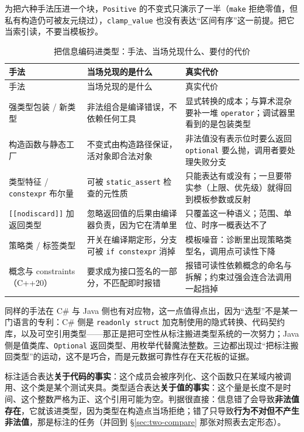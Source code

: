 \documentclass[12pt,a4paper,fontset=fandol]{ctexbook}
\begin{document}
\begin{warning}[title={上面的代码是手法示意，不是可直接编译的完整程序}]
为把六种手法压进一个块，\texttt{Positive} 的不变式只演示了一半（\texttt{make} 拒绝零值，但私有构造仍可被友元绕过），\texttt{clamp\_value} 也没有表达“区间有序”这一前提。把它当索引读，不要当模板抄。
\end{warning}

{\footnotesize
\begin{longtable}{@{}>{\raggedright\arraybackslash}p{}>{\raggedright\arraybackslash}p{}>{\raggedright\arraybackslash}p{}@{}}
\caption{把信息编码进类型：手法、当场兑现什么、要付的代价}\label{tab:ch3-into-type}\\
\toprule
手法 & 当场兑现的是什么 & 真实代价 \\
\midrule
\endfirsthead
\toprule
手法 & 当场兑现的是什么 & 真实代价 \\
\midrule
\endhead
\bottomrule
\endfoot
强类型包装 / 新类型 & 非法组合是编译错误，不依赖任何工具 & 显式转换的成本；与算术混杂要补一堆 \texttt{operator}；调试器里看到的是包装类型 \\
构造函数与静态工厂 & 不变式由构造路径保证，活对象即合法对象 & 非法值没有表示位时要么返回 \texttt{optional} 要么抛，调用者要处理失败分支 \\
类型特征 / \texttt{constexpr} 布尔量 & 可被 \texttt{static\_assert} 检查的元性质 & 只能表达有或没有；一旦要带实参（上限、优先级）就得回到模板参数或反射 \\
\texttt{[[nodiscard]]} 加返回类型 & 忽略返回值的后果由编译器负责，因为它在清单里 & 只覆盖这一种语义；范围、单位、时序一概表达不了 \\
策略类 / 标签类型 & 开关在编译期定形，分支可被 \texttt{if constexpr} 消掉 & 模板噪音：诊断里出现策略类型名，调用点可读性下降 \\
概念与 constraints（C++20） & 要求成为接口签名的一部分，不匹配即时报错 & 报错可读性依赖概念的命名与拆解；约束过强会连合法调用一起挡掉 \\
\end{longtable}}

同样的手法在 C\# 与 Java 侧也有对应物，这一点值得点出，因为“选型”不是某一门语言的专利：C\# 侧是 \texttt{readonly struct} 加克制使用的隐式转换、代码契约库，以及可空引用类型——那正是把可空性从标注搬进类型系统的一次努力；Java 侧是值类库、\texttt{Optional} 返回类型、用枚举代替魔法整数。三边都出现过“把标注搬回类型”的运动，这不是巧合，而是元数据可靠性存在天花板的证据。

\begin{compare}[title={标注与类型的分工：一条判据}]
标注适合表达\textbf{关于代码的事实}：这个成员会被序列化、这个函数只在某域内被调用、这个类是某个测试夹具。类型适合表达\textbf{关于值的事实}：这个量是长度不是时间、这个整数严格为正、这个引用可能为空。判据很直接：信息错了会导致\textbf{非法值存在}，它就该进类型，因为类型在构造点当场拒绝；错了只导致\textbf{行为不对但不产生非法值}，那是标注的任务（并回到 \S\ref{sec:two-compare} 那张对照表去定形态）。
\end{compare}
\end{document}
